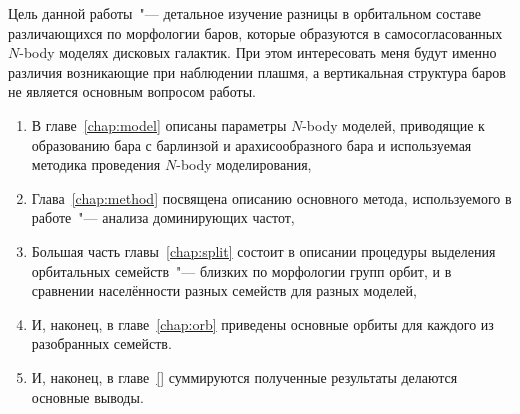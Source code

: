 \documentclass{trlnotes}
\begin{document}
Цель данной работы~"--- детальное изучение разницы в орбитальном составе различающихся по морфологии баров, которые образуются в самосогласованных $N$-body моделях дисковых галактик. При этом интересовать меня будут именно различия
возникающие при наблюдении плашмя, а вертикальная структура баров не является основным вопросом работы. 
\begin{enumerate}
  \item В главе~\ref{chap:model} описаны параметры $N$-body моделей, приводящие к образованию бара с барлинзой и
    арахисообразного бара и используемая методика проведения $N$-body моделирования,
  \item Глава~\ref{chap:method} посвящена описанию основного метода, используемого в работе~"--- анализа
    доминирующих частот,
  \item Большая часть главы~\ref{chap:split} состоит в описании процедуры выделения орбитальных семейств~"---
    близких по морфологии групп орбит, и в сравнении населённости разных семейств для разных моделей, 
  \item И, наконец, в главе~\ref{chap:orb} приведены основные орбиты для каждого из разобранных семейств.
  \item И, наконец, в главе~\ref{} суммируются полученные результаты делаются основные выводы.
\end{enumerate}
\end{document}
